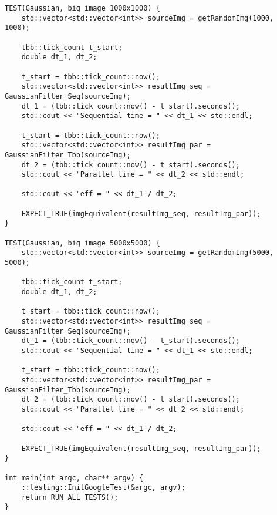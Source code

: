 \documentclass{report}
\begin{document}
\begin{lstlisting}
TEST(Gaussian, big_image_1000x1000) {
    std::vector<std::vector<int>> sourceImg = getRandomImg(1000, 1000);

    tbb::tick_count t_start;
    double dt_1, dt_2;

    t_start = tbb::tick_count::now();
    std::vector<std::vector<int>> resultImg_seq = GaussianFilter_Seq(sourceImg);
    dt_1 = (tbb::tick_count::now() - t_start).seconds();
    std::cout << "Sequential time = " << dt_1 << std::endl;

    t_start = tbb::tick_count::now();
    std::vector<std::vector<int>> resultImg_par = GaussianFilter_Tbb(sourceImg);
    dt_2 = (tbb::tick_count::now() - t_start).seconds();
    std::cout << "Parallel time = " << dt_2 << std::endl;

    std::cout << "eff = " << dt_1 / dt_2;

    EXPECT_TRUE(imgEquivalent(resultImg_seq, resultImg_par));
}

TEST(Gaussian, big_image_5000x5000) {
    std::vector<std::vector<int>> sourceImg = getRandomImg(5000, 5000);

    tbb::tick_count t_start;
    double dt_1, dt_2;

    t_start = tbb::tick_count::now();
    std::vector<std::vector<int>> resultImg_seq = GaussianFilter_Seq(sourceImg);
    dt_1 = (tbb::tick_count::now() - t_start).seconds();
    std::cout << "Sequential time = " << dt_1 << std::endl;

    t_start = tbb::tick_count::now();
    std::vector<std::vector<int>> resultImg_par = GaussianFilter_Tbb(sourceImg);
    dt_2 = (tbb::tick_count::now() - t_start).seconds();
    std::cout << "Parallel time = " << dt_2 << std::endl;

    std::cout << "eff = " << dt_1 / dt_2;

    EXPECT_TRUE(imgEquivalent(resultImg_seq, resultImg_par));
}

int main(int argc, char** argv) {
    ::testing::InitGoogleTest(&argc, argv);
    return RUN_ALL_TESTS();
}
\end{lstlisting}
\newpage
\end{document}
